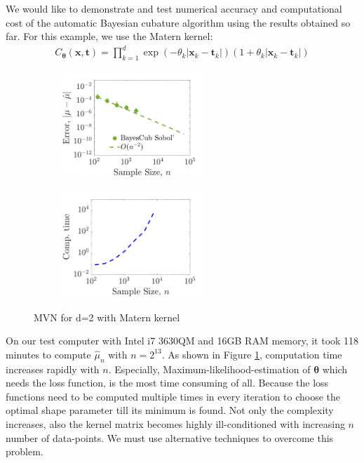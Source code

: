 \documentclass[smallextended]{svjour3}       %
\newcommand{\bm}[1]{\boldsymbol{#1}}
\newcommand{\vtheta}{{\bm{\theta}}}
\newcommand{\vt}{\bm{t}}
\newcommand{\vx}{\bm{x}}
\newcommand{\hmu}{\hat{\mu}}
\begin{document}
We would like to demonstrate and test numerical accuracy and computational cost of the automatic {Bayesian cubature algorithm} using the results obtained so far.
For this example, we use the Matern kernel:
\begin{align}
\label{matern_kernel}
C_{\vtheta}(\vx, \vt) = \prod_{k=1}^d \exp(-\theta_k|\vx_k-\vt_k|)(1+\theta_k |\vx_k-\vt_k|)
\end{align}



\begin{figure}[htp]
\captionsetup[subfigure]{labelformat=empty}
\centering
\begin{subfigure}[b]{0.49\textwidth}
\includegraphics[height=4cm]{MVNBayesianWtSobol}
\end{subfigure}
\centering
\begin{subfigure}[b]{0.49\textwidth}
\includegraphics[height=4cm]{MVN_bayesianCubaturecomputeTime}
\end{subfigure}
\caption{MVN for d=2 with Matern kernel  }
\label{fig:MVN_Metern_d2b2}
\end{figure}
On our test computer with Intel i7 3630QM and 16GB RAM memory, it took 118 minutes to compute $\hmu_n$ with $n=2^{13}$. As shown in Figure \ref{fig:MVN_Metern_d2b2}, computation time increases rapidly with $n$. 
Especially, Maximum-likelihood-estimation of $\vtheta$ which needs the loss function, is the most time consuming of all. 
Because the loss functions need to be computed multiple times in every iteration to choose the optimal shape parameter till its minimum is found. 
Not only the complexity increases, also the kernel matrix becomes highly ill-conditioned with increasing $n$ number of data-points.
We must use alternative techniques to overcome this problem.
\end{document}
